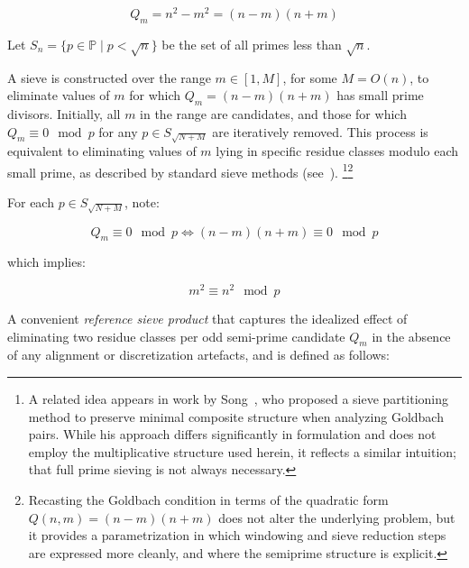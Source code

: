 \documentclass[11pt]{article}
\theoremstyle{inline}
\theoremstyle{break}
\theoremstyle{break}
\theoremstyle{break}
\theoremstyle{break}
\theoremstyle{break}
\theoremstyle{break}
\theoremstyle{break}
\theoremstyle{inline}
\begin{document}
\begin{equation}
Q_m = n^2 - m^2 = (n - m)(n + m)
\end{equation}

Let \( S_n = \{ p \in \mathbb{P} \mid p < \sqrt{n} \} \) be the set of all primes less than \( \sqrt{n} \).

A sieve is constructed over the range \( m \in [1, M] \), for some \( M = O(n) \), to eliminate values of \( m \) for which \( Q_m = (n - m)(n + m) \) has small prime divisors. Initially, all \( m \) in the range are candidates, and those for which \( Q_m \equiv 0 \mod p \) for any \( p \in S_{\sqrt{N+M}} \) are iteratively removed. This process is equivalent to eliminating values of \( m \) lying in specific residue classes modulo each small prime, as described by standard sieve methods (see~\cite{HalberstamRichert1974,IwaniecKowalski2004,FriedlanderIwaniec2010}).  \footnote{A related idea appears in work by Song~\cite{Song2008}, who proposed a sieve partitioning method to preserve minimal composite structure when analyzing Goldbach pairs. While his approach differs significantly in formulation and does not employ the multiplicative structure used herein, it reflects a similar intuition; that full prime sieving is not always necessary.}\footnote{Recasting the Goldbach condition in terms of the quadratic form \(Q(n,m)=(n-m)(n+m)\) does not alter the underlying problem, but it provides a parametrization in which windowing and sieve reduction steps are expressed more cleanly, and where the semiprime structure is explicit.}

For each \( p \in S_{\sqrt{N+M}} \), note:

\begin{equation}
Q_m \equiv 0 \mod p \iff (n - m)(n + m) \equiv 0 \mod p
\end{equation}

which implies:

\begin{equation}
m^2 \equiv n^2 \mod p
\end{equation}

A convenient \emph{reference sieve product} that captures the idealized effect of
eliminating two residue classes per odd semi-prime candidate \( Q_m \) in the absence of any
alignment or discretization artefacts, and is defined as follows:
\end{document}
